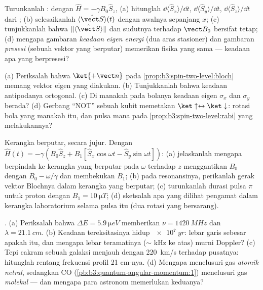 \begin{exercise}[$\star\star$]\label{exo:b3:spin-two-level:5}
Turunkanlah : dengan $\hat H = -\gamma B_0\hat S_z$, (a)
hitunglah $\dd\langle\hat S_x\rangle/\dd t$, $\dd\langle\hat
S_y\rangle/\dd t$, $\dd\langle\hat S_z\rangle/\dd t$ dari
; (b) selesaikanlah $\langle\hat{\vect S}\rangle(t)$ dengan
 awalnya sepanjang $x$; (c) tunjukkanlah bahwa
$\|\langle\hat{\vect S}\rangle\|$ dan sudutnya terhadap $\vect B_0$
bersifat tetap; (d) mengapa gambaran \emph{keadaan eigen energi} (dua
aras stasioner) dan gambaran \emph{presesi} (sebuah vektor yang
berputar) memerikan fisika yang sama --- keadaan apa yang berpresesi?
\end{exercise}

\begin{exercise}[$\star\star$]\label{exo:b3:spin-two-level:6}
(a) Periksalah bahwa $\ket{+\vect n}$ pada
\cref{prop:b3:spin-two-level:bloch} memang vektor eigen yang diakukan.
(b) Tunjukkanlah bahwa keadaan antipodanya ortogonal. (c) Di manakah
pada bolanya keadaan eigen $\sigma_x$ dan $\sigma_y$ berada? (d) Gerbang
``NOT'' sebuah kubit memetakan $\ket\uparrow \leftrightarrow \ket\downarrow$:
rotasi bola yang manakah itu, dan pulsa mana pada
\cref{prop:b3:spin-two-level:rabi} yang melakukannya?
\end{exercise}

\begin{exercise}[$\star\star$]\label{exo:b3:spin-two-level:7}
Kerangka berputar, secara jujur. Dengan $\hat H(t) = -\gamma(B_0\hat S_z
+ B_1[\hat S_x\cos\omega t - \hat S_y\sin\omega t])$: (a) jelaskanlah
mengapa berpindah ke kerangka yang berputar pada $\omega$ terhadap $z$
menggantikan $B_0$ dengan $B_0 - \omega/\gamma$ dan membekukan $B_1$;
(b) pada resonansinya, perikanlah gerak vektor Blochnya dalam kerangka
yang berputar; (c) turunkanlah durasi pulsa $\pi$ untuk proton dengan $B_1 =
\qty{10}{\micro T}$; (d) sketsalah apa yang dilihat
pengamat dalam kerangka laboratorium selama pulsa itu (dua rotasi yang
bersarang).
\end{exercise}

\begin{exercise}[$\star\star$]\label{exo:b3:spin-two-level:8}
. (a) Periksalah bahwa $\Delta E = \qty{5.9}{\micro eV}$
memberikan $\nu = \qty{1420}{MHz}$ dan $\lambda = \qty{21.1}{cm}$. (b)
Keadaan tereksitasinya hidup $\qty{e7}{yr}$: lebar garis sebesar apakah
itu, dan mengapa lebar teramatinya ($\sim$ kHz ke atas) murni Doppler?
(c) Tepi cakram sebuah galaksi menjauh dengan \qty{220}{km/s} terhadap
pusatnya: hitunglah rentang frekuensi profil 21 cm-nya. (d) Mengapa
 menelusuri gas \emph{atomik netral}, sedangkan CO
(\cref{pb:b3:quantum-angular-momentum:1}) menelusuri gas
\emph{molekul} --- dan mengapa para astronom memerlukan keduanya?
\end{exercise}

